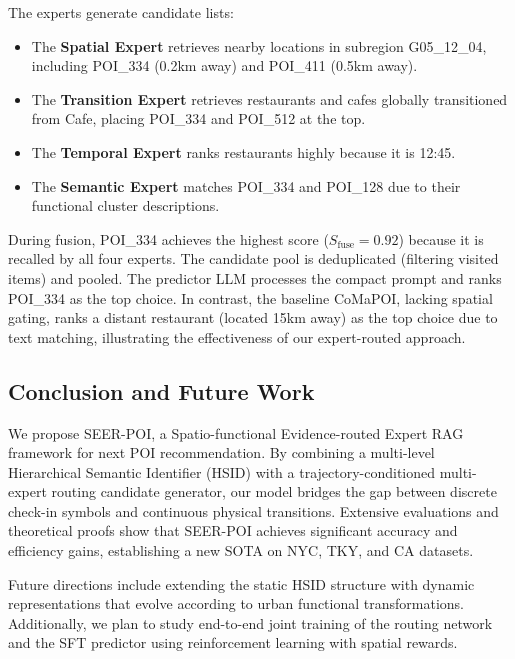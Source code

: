 \documentclass[10pt,twocolumn]{article}
\newcommand{\method}{SEER-POI}
\newcommand{\hsid}{HSID}
\begin{document}
The experts generate candidate lists:
\begin{itemize}
    \item The \textbf{Spatial Expert} retrieves nearby locations in subregion G05\_12\_04, including POI\_334 (0.2km away) and POI\_411 (0.5km away).
    \item The \textbf{Transition Expert} retrieves restaurants and cafes globally transitioned from Cafe, placing POI\_334 and POI\_512 at the top.
    \item The \textbf{Temporal Expert} ranks restaurants highly because it is 12:45.
    \item The \textbf{Semantic Expert} matches POI\_334 and POI\_128 due to their functional cluster descriptions.
\end{itemize}

During fusion, POI\_334 achieves the highest score ($S_{\mathrm{fuse}} = 0.92$) because it is recalled by all four experts. The candidate pool is deduplicated (filtering visited items) and pooled. The predictor LLM processes the compact prompt and ranks POI\_334 as the top choice. In contrast, the baseline CoMaPOI, lacking spatial gating, ranks a distant restaurant (located 15km away) as the top choice due to text matching, illustrating the effectiveness of our expert-routed approach.

\subsection{Conclusion and Future Work}
We propose \method, a Spatio-functional Evidence-routed Expert RAG framework for next POI recommendation. By combining a multi-level Hierarchical Semantic Identifier (\hsid) with a trajectory-conditioned multi-expert routing candidate generator, our model bridges the gap between discrete check-in symbols and continuous physical transitions. Extensive evaluations and theoretical proofs show that \method{} achieves significant accuracy and efficiency gains, establishing a new SOTA on NYC, TKY, and CA datasets.

Future directions include extending the static \hsid{} structure with dynamic representations that evolve according to urban functional transformations. Additionally, we plan to study end-to-end joint training of the routing network and the SFT predictor using reinforcement learning with spatial rewards.
\end{document}
